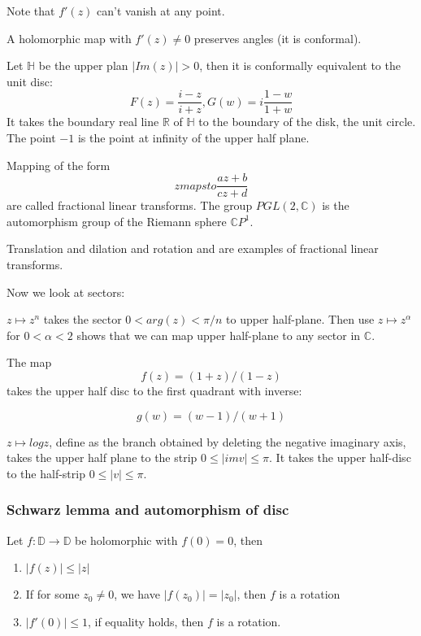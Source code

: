 \documentclass[main.tex]{subfiles}
\begin{document}
Note that $f'(z)$ can't vanish at any point.

A holomorphic map with $f'(z) \neq 0$ preserves angles (it is conformal).

\begin{example}
Let $\mathbb{H}$ be the upper plan $|Im (z)| > 0$, then it is conformally equivalent to the unit disc:
$$
F(z) = \frac{i -z}{i + z}, G(w) = i \frac{1-w}{1+w}
$$
It takes the boundary real line $\mathbb{R}$ of $\mathbb{H}$ to the boundary of the disk, the unit circle. The point $-1$ is the point at infinity of the upper half plane.
\end{example}

Mapping of the form 
$$
z mapsto \frac{az + b}{cz + d}
$$
are called fractional linear transforms. The group $PGL(2, \mathbb{C})$ is the automorphism group of the Riemann sphere $\mathbb{C}P^1$.

Translation and dilation and rotation and are examples of fractional linear transforms.

Now we look at sectors:

\begin{example}
$z \mapsto z^n$ takes the sector $0 < arg(z) < \pi/n$ to upper half-plane.
Then use $z \mapsto z^\alpha$ for $0 < \alpha < 2$ shows that we can map upper half-plane to any sector in $\mathbb{C}$.
\end{example}

\begin{example}
The map 
$$
f(z) = (1 + z)/(1 -z)
$$
takes the upper half disc to the first quadrant with inverse:

$$
g(w) = (w-1)/(w+1)
$$
\end{example}

\begin{example}
$z \mapsto log z$, define as the branch obtained by deleting the negative imaginary axis, takes the upper half plane to the strip $0 \leq |im v| \leq \pi$. It takes the upper half-disc to the half-strip $0 \leq |v| \leq \pi$.
\end{example}


\subsubsection{Schwarz lemma and automorphism of disc}

\begin{lemma}
Let $f: \mathbb{D} \rightarrow \mathbb{D}$ be holomorphic with $f(0) = 0$, then
\begin{enumerate}
    \item $|f(z)| \leq |z|$
    \item If for some $z_0 \neq 0$, we have $|f(z_0)| = |z_0|$, then $f$ is a rotation
    \item $|f'(0)| \leq 1$, if equality holds, then $f$ is a rotation.
\end{enumerate}
\end{lemma}
\end{document}
